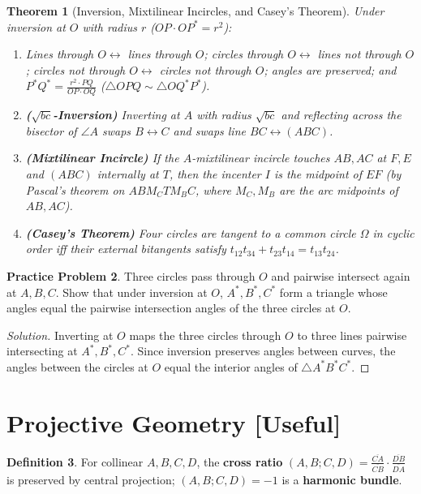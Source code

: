\documentclass[11pt]{article}
\theoremstyle{plain}
\newtheorem{theorem}{Theorem}[section]
\theoremstyle{definition}
\newtheorem{definition}[theorem]{Definition}
\newtheorem{problem}[theorem]{Practice Problem}
\newenvironment{solution}{\begin{proof}[Solution]}{\end{proof}}
\begin{document}
\begin{theorem}[Inversion, Mixtilinear Incircles, and Casey's Theorem]
Under inversion at $O$ with radius $r$ ($OP\cdot OP^* = r^2$):
\begin{enumerate}[label=(\alph*)]
\item Lines through $O \leftrightarrow$ lines through $O$; circles through $O \leftrightarrow$ lines not through $O$; circles not through $O \leftrightarrow$ circles not through $O$; angles are preserved; and $P^*Q^* = \frac{r^2\cdot PQ}{OP\cdot OQ}$ ($\triangle OPQ \sim \triangle OQ^*P^*$).
\item \textbf{($\sqrt{bc}$-Inversion)} Inverting at $A$ with radius $\sqrt{bc}$ and reflecting across the bisector of $\angle A$ swaps $B\leftrightarrow C$ and swaps line $BC \leftrightarrow (ABC)$.
\item \textbf{(Mixtilinear Incircle)} If the $A$-mixtilinear incircle touches $AB, AC$ at $F, E$ and $(ABC)$ internally at $T$, then the incenter $I$ is the midpoint of $EF$ (by Pascal's theorem on $A B M_C T M_B C$, where $M_C, M_B$ are the arc midpoints of $AB, AC$).
\item \textbf{(Casey's Theorem)} Four circles are tangent to a common circle $\Omega$ in cyclic order iff their external bitangents satisfy $t_{12}t_{34} + t_{23}t_{14} = t_{13}t_{24}$.
\end{enumerate}
\end{theorem}

\begin{problem}
Three circles pass through $O$ and pairwise intersect again at $A, B, C$. Show that under inversion at $O$, $A^*, B^*, C^*$ form a triangle whose angles equal the pairwise intersection angles of the three circles at $O$.
\end{problem}
\begin{solution}
Inverting at $O$ maps the three circles through $O$ to three lines pairwise intersecting at $A^*, B^*, C^*$. Since inversion preserves angles between curves, the angles between the circles at $O$ equal the interior angles of $\triangle A^*B^*C^*$.
\end{solution}

\section{Projective Geometry [Useful]}

\begin{definition}
For collinear $A, B, C, D$, the \textbf{cross ratio} $(A,B;C,D) = \frac{\overline{CA}}{\overline{CB}} \cdot \frac{\overline{DB}}{\overline{DA}}$ is preserved by central projection; $(A,B;C,D) = -1$ is a \textbf{harmonic bundle}.
\end{definition}
\end{document}
